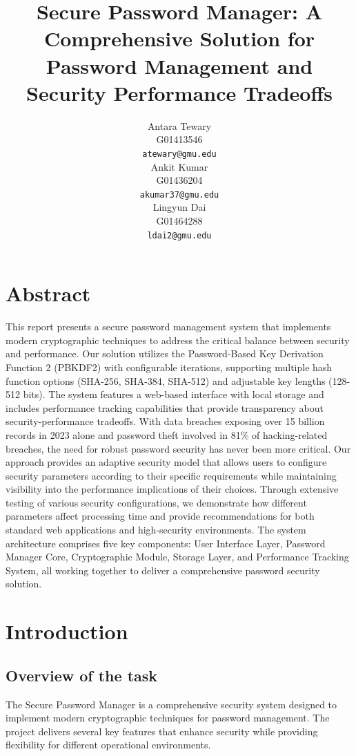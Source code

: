 \documentclass[11pt,a4paper]{article}
\title{Secure Password Manager: A Comprehensive Solution for Password Management and Security Performance Tradeoffs}
\author{Antara Tewary \\
  G01413546 \\
  \texttt{atewary@gmu.edu} \\\And
  Ankit Kumar\\
  G01436204\\
  \texttt{akumar37@gmu.edu} \\\And 
  Lingyun Dai\\ 
  G01464288\\ 
  \texttt{ldai2@gmu.edu} \\}
\date{}
\begin{document}
\maketitle
\section{Abstract}
This report presents a secure password management system that implements modern cryptographic techniques to address the critical balance between security and performance. Our solution utilizes the Password-Based Key Derivation Function 2 (PBKDF2) with configurable iterations, supporting multiple hash function options (SHA-256, SHA-384, SHA-512) and adjustable key lengths (128-512 bits). The system features a web-based interface with local storage and includes performance tracking capabilities that provide transparency about security-performance tradeoffs.
With data breaches exposing over 15 billion records in 2023 alone and password theft involved in 81\% of hacking-related breaches, the need for robust password security has never been more critical. Our approach provides an adaptive security model that allows users to configure security parameters according to their specific requirements while maintaining visibility into the performance implications of their choices. Through extensive testing of various security configurations, we demonstrate how different parameters affect processing time and provide recommendations for both standard web applications and high-security environments. The system architecture comprises five key components: User Interface Layer, Password Manager Core, Cryptographic Module, Storage Layer, and Performance Tracking System, all working together to deliver a comprehensive password security solution.
\section{Introduction}

            \subsection{Overview of the task}
            The Secure Password Manager is a comprehensive security system designed to implement modern cryptographic techniques for password management. The project delivers several key features that enhance security while providing flexibility for different operational environments. 
            
\end{document}
